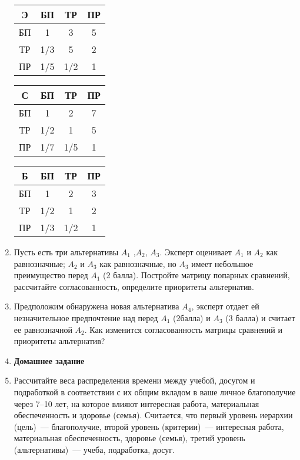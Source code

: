\documentclass[a4paper,14pt]{extarticle}
\begin{document}
\begin{enumerate}
    {\centering
    \begin{tabular}{c|ccc}
        \textbf{Э}  & БП  & ТР  & ПР \\ 
        \hline
        БП & 1   & 3   & 5  \\
        ТР & 1/3 & 5   & 2  \\
        ПР & 1/5 & 1/2 & 1  \\
    \end{tabular}\quad
    \begin{tabular}{c|ccc}
        \textbf{С}  & БП  & ТР  & ПР\\ 
        \hline
        БП & 1   & 2   & 7 \\
        ТР & 1/2 & 1   & 5 \\
        ПР & 1/7 & 1/5 & 1 \\
    \end{tabular}\quad
    \begin{tabular}{c|ccc}
        \textbf{Б}  & БП  & ТР  & ПР\\ 
        \hline
        БП & 1   & 2   & 3 \\
        ТР & 1/2 & 1   & 2 \\
        ПР & 1/3 & 1/2 & 1 \\
    \end{tabular}
    \par}
    \item 
		Пусть есть три альтернативы  $A_1$ ,$A_2$, $A_3$.  Эксперт оценивает $A_1$ и $A_2$ как равнозначные; $A_2$ и $A_3$ как равнозначные, но $A_3$ имеет небольшое преимущество перед $A_1$ (2 балла).
		Постройте матрицу попарных сравнений, рассчитайте согласованность, определите приоритеты альтернатив.
		
	\item 	Предположим обнаружена новая альтернатива $A_4$, эксперт отдает ей незначительное предпочтение над перед $A_1$ (2балла) и $A_3$ (3 балла) и считает ее равнозначной $A_2$. 
	Как изменится согласованность матрицы сравнений  и приоритеты альтернатив?
	
	\item[] \textbf{Домашнее задание}
    \item 
    	Рассчитайте веса распределения времени между учебой, досугом и подработкой в соответствии с их общим вкладом в ваше личное благополучие через 7--10 лет, на которое влияют интересная работа, материальная обеспеченность и здоровье (семья). 
    	Считается, что первый уровень иерархии (цель)~--- благополучие, второй уровень (критерии)~--- интересная работа, материальная обеспеченность, здоровье (семья), третий уровень (альтернативы)~--- учеба, подработка, досуг.
 \end{enumerate}
\end{document}
